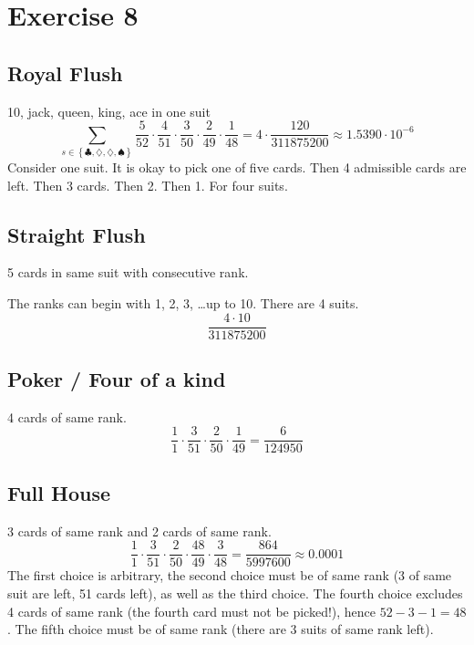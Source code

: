 \documentclass{article}
\newcommand\set[1]{\left\{#1\right\}}
\begin{document}
\section{Exercise 8}

\subsection{Royal Flush}
10, jack, queen, king, ace in one suit
\[ \sum_{s \in \set{\clubsuit, \diamondsuit, \diamondsuit, \spadesuit}} \frac{5}{52} \cdot \frac{4}{51} \cdot \frac{3}{50} \cdot \frac{2}{49} \cdot \frac{1}{48} = 4 \cdot \frac{120}{311875200} \approx 1.5390\cdot 10^{-6} \]
Consider one suit. It is okay to pick one of five cards. Then 4 admissible cards are left. Then 3 cards. Then 2. Then 1. For four suits.

\subsection{Straight Flush}
5 cards in same suit with consecutive rank.

%
%

The ranks can begin with 1, 2, 3, \dots up to 10. There are 4 suits.
\[ \frac{4 \cdot 10}{311875200} \]

\subsection{Poker / Four of a kind}
4 cards of same rank.
\[ \frac{1}{1} \cdot \frac{3}{51} \cdot \frac{2}{50} \cdot \frac{1}{49} = \frac{6}{124950} \]

\subsection{Full House}
3 cards of same rank and 2 cards of same rank.
\[ \frac11 \cdot \frac{3}{51} \cdot \frac{2}{50} \cdot \frac{48}{49} \cdot \frac{3}{48} = \frac{864}{5997600} \approx 0.0001 \]
The first choice is arbitrary, the second choice must be of same rank (3 of same suit are left, 51 cards left), as well as the third choice.
The fourth choice excludes 4 cards of same rank (the fourth card must not be picked!), hence $52 - 3 - 1 = 48$. The fifth choice must be of same rank (there are 3 suits of same rank left).
\end{document}
